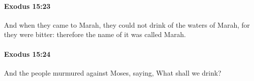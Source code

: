 		\paragraph{Exodus 15:23} %
			\label{EXODUS-15-23}

			And when they came to Marah, they could not drink of the waters of Marah, for they were bitter: therefore the name of it was called Marah.


		\paragraph{Exodus 15:24} %
			\label{EXODUS-15-24}

			And the people murmured against Moses, saying, What shall we drink?


